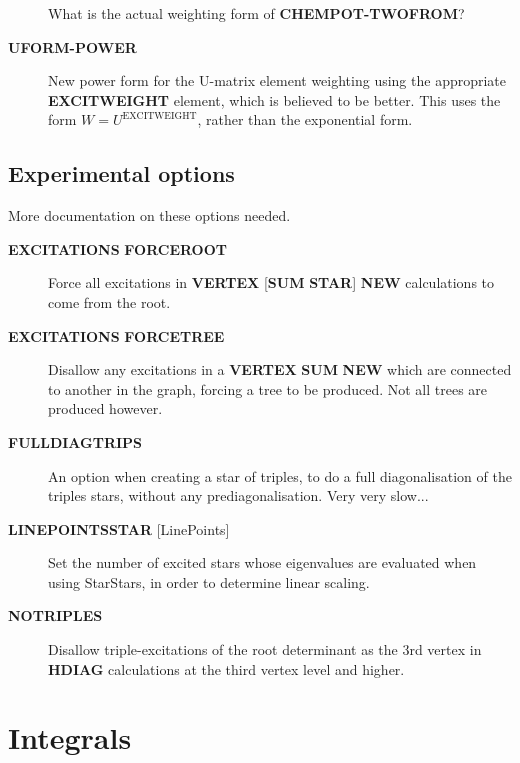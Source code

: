 \documentclass[openany,a4paper,10pt]{manual}
\begin{document}
\begin{description}
\begin{notice}[note]
What is the actual weighting form of \textbf{CHEMPOT-TWOFROM}?
\end{notice}

\item[\textbf{UFORM-POWER}]
New power form for the U-matrix element weighting using the
appropriate \textbf{EXCITWEIGHT} element, which is believed to be
better. This uses the form $W=U^{\text{EXCITWEIGHT}}$, rather than the
exponential form.

\end{description}


\subsection{Experimental options}

\begin{notice}[note]
More documentation on these options needed.
\end{notice}
\begin{description}
\item[\textbf{EXCITATIONS} \textbf{FORCEROOT}]
Force all excitations in \textbf{VERTEX} {[}\textbf{SUM} \textbf{STAR}{]} \textbf{NEW}
calculations to come from the root.

\item[\textbf{EXCITATIONS} \textbf{FORCETREE}]
Disallow any excitations in a \textbf{VERTEX} \textbf{SUM} \textbf{NEW} which are
connected to another in the graph, forcing a tree to be produced.
Not all trees are produced however.

\item[\textbf{FULLDIAGTRIPS}]
An option when creating a star of triples, to do a
full diagonalisation of the triples stars, without any
prediagonalisation. Very very slow...

\item[\textbf{LINEPOINTSSTAR} {[}LinePoints{]}]
Set the number of excited stars whose eigenvalues are evaluated when
using StarStars, in order to determine linear scaling.

\item[\textbf{NOTRIPLES}]
Disallow triple-excitations of the root determinant as the 3rd vertex
in \textbf{HDIAG} calculations at the third vertex level and higher.

\end{description}

\resetcurrentobjects


\hypertarget{input-integrals}{}\section{Integrals}
\end{document}
